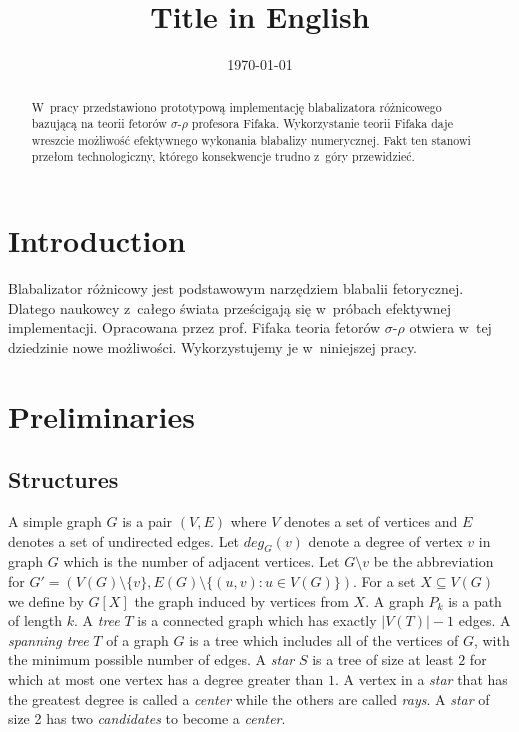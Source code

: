 \documentclass[en]{pracamgr}
\title{Title in English}
\date{\monthyeardate\today}
\begin{document}
\maketitle

\begin{abstract}
  W~pracy przedstawiono prototypową implementację blabalizatora
  różnicowego bazującą na teorii fetorów $\sigma$-$\rho$ profesora
  Fifaka.  Wykorzystanie teorii Fifaka daje wreszcie możliwość
  efektywnego wykonania blabalizy numerycznej.  Fakt ten stanowi
  przełom technologiczny, którego konsekwencje trudno z~góry
  przewidzieć.
\end{abstract}

\tableofcontents

\chapter*{Introduction}

Blabalizator różnicowy jest podstawowym narzędziem blabalii
fetorycznej.  Dlatego naukowcy z~całego świata prześcigają się
w~próbach efektywnej implementacji.  Opracowana przez prof. Fifaka
teoria fetorów $\sigma$-$\rho$ otwiera w~tej dziedzinie nowe
możliwości.  Wykorzystujemy je w~niniejszej pracy.

\chapter{Preliminaries}\label{r:pojecia}

\section{Structures}

A simple graph $G$ is a pair $(V,E)$ where $V$ denotes a set of vertices and $E$ denotes a set of undirected edges. Let $deg_G(v)$ denote a degree of vertex $v$ in graph $G$ which is the number of adjacent vertices. Let $G \setminus v$ be the abbreviation for $G'=(V(G) \setminus \{v\}, E(G) \setminus \{(u,v): u \in V(G)\})$. For a set $X \subseteq V(G)$ we define by $G[X]$ the graph induced by vertices from $X$. A graph $P_k$ is a path of length $k$. A \emph{tree} $T$ is a connected graph which has exactly $|V(T)|-1$ edges. A \emph{spanning tree} $T$ of a graph $G$ is a tree which includes all of the vertices of $G$, with the minimum possible number of edges. A \emph{star} $S$ is a tree of size at least $2$ for which at most one vertex has a degree greater than $1$. A vertex in a \emph{star} that has the greatest degree is called a \emph{center} while the others are called \emph{rays}. A \emph{star} of size 2 has two \emph{candidates} to become a \emph{center}.
\end{document}

